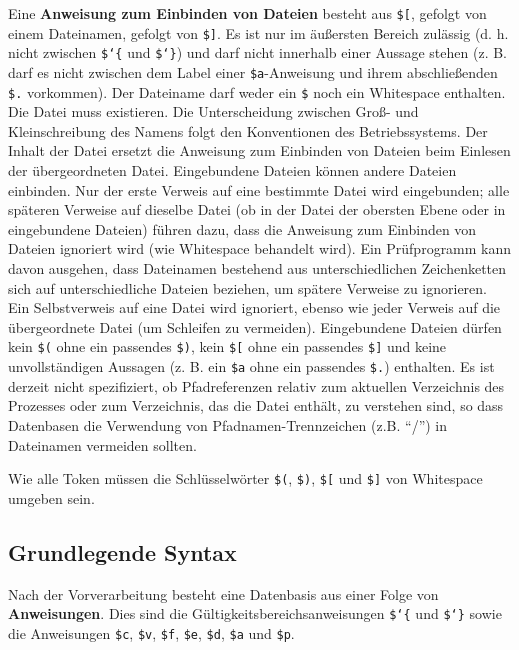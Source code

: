 Eine {\bf Anweisung zum Einbinden von Dateien} besteht aus \texttt{\$[}, gefolgt von einem Dateinamen, gefolgt von \texttt{\$]}. Es ist nur im äußersten Bereich zulässig (d. h. nicht zwischen \texttt{\$\char`\{} und \texttt{\$\char`\}}) und darf nicht innerhalb einer Aussage stehen (z. B. darf es nicht zwischen dem Label einer \texttt{\$a}-Anweisung und ihrem abschließenden \texttt{\$.} vorkommen). Der Dateiname darf weder ein \texttt{\$} noch ein Whitespace enthalten.  Die Datei muss existieren. Die Unterscheidung zwischen Groß- und Kleinschreibung des Namens folgt den Konventionen des Betriebssystems.  Der Inhalt der Datei ersetzt die Anweisung zum Einbinden von Dateien beim Einlesen der übergeordneten Datei. Eingebundene Dateien können andere Dateien einbinden. Nur der erste Verweis auf eine bestimmte Datei wird eingebunden; alle späteren Verweise auf dieselbe Datei (ob in der Datei der obersten Ebene oder in eingebundene Dateien) führen dazu, dass die Anweisung zum Einbinden von Dateien ignoriert wird (wie Whitespace behandelt wird). Ein Prüfprogramm kann davon ausgehen, dass Dateinamen bestehend aus unterschiedlichen Zeichenketten sich auf unterschiedliche Dateien beziehen, um spätere Verweise zu ignorieren. Ein Selbstverweis auf eine Datei wird ignoriert, ebenso wie jeder Verweis auf die übergeordnete Datei (um Schleifen zu vermeiden). Eingebundene Dateien dürfen kein \texttt{\$(} ohne ein passendes \texttt{\$)}, kein \texttt{\$[} ohne ein passendes \texttt{\$]} und keine unvollständigen Aussagen (z. B. ein \texttt{\$a} ohne ein passendes \texttt{\$.}) enthalten. Es ist derzeit nicht spezifiziert, ob Pfadreferenzen relativ zum aktuellen Verzeichnis des Prozesses oder zum Verzeichnis, das die Datei enthält, zu verstehen sind, so dass Datenbasen die Verwendung von Pfadnamen-Trennzeichen (z.B. "`/"') in Dateinamen vermeiden sollten.

Wie alle Token müssen die Schlüsselwörter \texttt{\$(}, \texttt{\$)}, \texttt{\$[} und \texttt{\$]}
von Whitespace umgeben sein.

\subsection{Grundlegende Syntax}

Nach der Vorverarbeitung besteht eine Datenbasis aus einer Folge von {\bf Anweisungen}. Dies sind die Gültigkeitsbereichsanweisungen \texttt{\$\char`\{} und \texttt{\$\char`\}} sowie die Anweisungen \texttt{\$c}, \texttt{\$v}, \texttt{\$f}, \texttt{\$e}, \texttt{\$d}, \texttt{\$a} und \texttt{\$p}.

